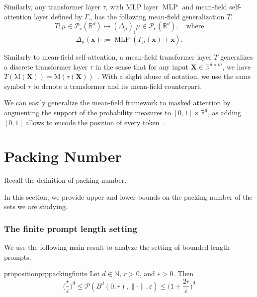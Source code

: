 \begin{definition}

Similarly, any transformer layer $\tau$, with MLP layer $\operatorname{MLP}$ and mean-field self-attention layer defined by $\Gamma_\cdot$, has the following mean-field generalization $T$.
\[
T: \mu \in \mathcal{P}_{\mathrm c}(\mathbb{R}^d) \mapsto (\Delta_\mu)_{\sharp} \mu \in \mathcal{P}_{\mathrm c}(\mathbb{R}^d),\quad\mbox{where}
\]
\[
\Delta_\mu(\mathbf x) := \operatorname{MLP}(\Gamma_\mu(\mathbf x)+\mathbf x).
\]

Similarly to mean-field self-attention, a mean-field transformer layer $T$ generalizes a discrete transformer layer $\tau$ in the sense that for any input \(\mathbf X \in \mathbb{R}^{d\times m} \), we have \( T(\mathrm{M}(\mathbf X)) = \mathrm{M}(\tau(\mathbf X)) \)~\citep{meyer2025memorylimitationsprompttuning}. With a slight abuse of notation, we use the same symbol $\tau$ to denote a transformer and its mean-field counterpart.

\begin{remark}
    We can easily generalize the mean-field framework to masked attention by augmenting the support of the probability measures to $[0,1]\times\mathbb R^d$, as adding $[0,1]$ allows to encode the position of every token~\citep{Castin_V_2024_p-icml_lipschitz}.
\end{remark}

    
\end{definition}



\section{Packing Number}\label{app:packing}

Recall the definition of packing number.


In this section, we provide upper and lower bounds on the packing number of the sets we are studying.

\subsubsection*{The finite prompt length setting}

We use the following main result to analyze the setting of bounded length prompts.

\begin{restatable}{proposition}{prppackingfinite}\label{prp:packing_finite}
    Let $d\in\mathbb N$, $r>0$, and \( \varepsilon > 0 \). Then
    \[
        \Big(\frac{r}\varepsilon\Big)^d\leq\mathcal{P}(B^d(0,r), \|\cdot\|,\varepsilon)\leq\Big(1+\frac{2r}\varepsilon\Big)^d
    \]
\end{restatable}

